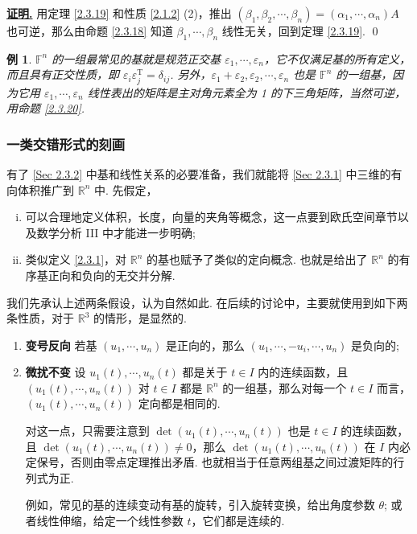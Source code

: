 \documentclass[10pt,openany]{article}
\theoremstyle{thmstyle} %
\theoremstyle{defstyle} %
\theoremstyle{prostyle} %
\theoremstyle{exastyle}
\newtheorem{example}[theorem]{例}
\theoremstyle{remstyle}
\renewenvironment{proof}[1][证明]{\par\underline{\textbf{#1.}} \;\fangsong}{\qed\par}
\newcommand{\T}{^{\text{T}}}
\newcommand{\F}{\mathbb{F}}
\newcommand{\R}{\mathbb{R}}
\begin{document}
\begin{proof}
	用定理 \ref{2.3.19} 和性质 \ref{2.1.2} (2)，推出 \( (\beta_1,\beta_2,\cdots,\beta_n)=(\alpha_1,\cdots,\alpha_n)A \) 也可逆，那么由命题 \ref{2.3.18} 知道 \( \beta_1,\cdots,\beta_n \) 线性无关，回到定理 \ref{2.3.19}.
\end{proof}

\begin{example}
	\( \F^n \) 的一组最常见的基就是规范正交基 \( \varepsilon_1,\cdots,\varepsilon_n \)，它不仅满足基的所有定义，而且具有正交性质，即 \( \varepsilon_i\varepsilon_j\T=\delta_{ij} \). 另外，\( \varepsilon_1+\varepsilon_2,\varepsilon_2, \cdots,\varepsilon_n \) 也是 \( \F^n \) 的一组基，因为它用 \( \varepsilon_1,\cdots,\varepsilon_n \) 线性表出的矩阵是主对角元素全为 1 的下三角矩阵，当然可逆，用命题 \ref{2.3.20}.
\end{example}

\subsubsection{一类交错形式的刻画}

有了 \ref{Sec 2.3.2} 中基和线性关系的必要准备，我们就能将 \ref{Sec 2.3.1} 中三维的有向体积推广到 \( \R^n \) 中. 先假定，
\begin{enumerate}[(i)]
	\item 可以合理地定义体积，长度，向量的夹角等概念，这一点要到欧氏空间章节以及数学分析 III 中才能进一步明确;
	\item 类似定义 \ref{2.3.1}，对 \( \R^n \) 的基也赋予了类似的定向概念. 也就是给出了 \( \R^n \) 的有序基正向和负向的无交并分解.
\end{enumerate}

我们先承认上述两条假设，认为自然如此. 在后续的讨论中，主要就使用到如下两条性质，对于 \( \R^3 \) 的情形，是显然的.

\begin{enumerate}[(1)]
	\item \textbf{变号反向} \; 若基 \( (u_1,\cdots,u_n) \) 是正向的，那么 \( (u_1,\cdots,-u_i,\cdots,u_n) \) 是负向的;
	\item \textbf{微扰不变} \; 设 \( u_1(t),\cdots,u_n(t) \) 都是关于 \( t \in I \) 内的连续函数，且 \( (u_1(t),\cdots,u_n(t)) \) 对 \( t \in I \) 都是 \( \R^n \) 的一组基，那么对每一个 \( t \in I \) 而言，\( (u_1(t),\cdots,u_n(t)) \) 定向都是相同的. 
	
	对这一点，只需要注意到 \( \det(u_1(t),\cdots,u_n(t)) \) 也是 \( t \in I \) 的连续函数，且 \( \det(u_1(t),\cdots,u_n(t)) \neq 0 \)，那么 \( \det(u_1(t),\cdots,u_n(t)) \) 在 \( I \) 内必定保号，否则由零点定理推出矛盾. 也就相当于任意两组基之间过渡矩阵的行列式为正.
	
	例如，常见的基的连续变动有基的旋转，引入旋转变换，给出角度参数 \( \theta \); 或者线性伸缩，给定一个线性参数 \( t \)，它们都是连续的.
\end{enumerate}
\end{document}
